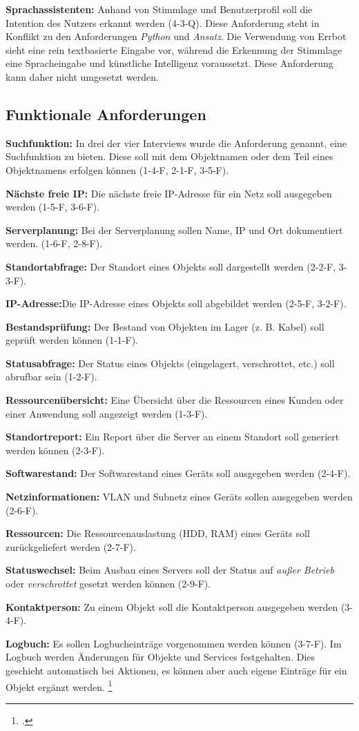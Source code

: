 \textbf{Sprachassistenten:} Anhand von Stimmlage und Benutzerprofil soll die Intention des Nutzers erkannt werden (4-3-Q). Diese Anforderung steht in Konflikt zu den Anforderungen \textit{Python} und \textit{Ansatz}. Die Verwendung von Errbot sieht eine rein textbasierte Eingabe vor, während die Erkennung der Stimmlage eine Spracheingabe und künstliche Intelligenz voraussetzt. Diese Anforderung kann daher nicht umgesetzt werden.


\subsection{Funktionale Anforderungen}
\textbf{Suchfunktion: } In drei der vier Interviews wurde die Anforderung genannt, eine Suchfunktion zu bieten. Diese soll mit dem Objektnamen oder dem Teil eines Objektnamens erfolgen können (1-4-F, 2-1-F, 3-5-F).

\textbf{Nächste freie IP: } Die nächste freie IP-Adresse für ein Netz soll ausgegeben werden (1-5-F, 3-6-F). 

\textbf{Serverplanung: } Bei der Serverplanung sollen Name, IP und Ort dokumentiert werden. (1-6-F, 2-8-F).

\textbf{Standortabfrage: } Der Standort eines Objekts soll dargestellt werden (2-2-F, 3-3-F).

\textbf{IP-Adresse:}Die IP-Adresse eines Objekts soll abgebildet werden (2-5-F, 3-2-F).

\textbf{Bestandsprüfung:} Der Bestand von Objekten im Lager (z. B. Kabel) soll geprüft werden können (1-1-F).

\textbf{Statusabfrage: }Der Status eines Objekts (eingelagert, verschrottet, etc.) soll abrufbar sein (1-2-F).

\textbf{Ressourcenübersicht:} Eine Übersicht über die Ressourcen eines Kunden oder einer Anwendung soll angezeigt werden (1-3-F).

\textbf{Standortreport:} Ein Report über die Server an einem Standort soll generiert werden können (2-3-F).

\textbf{Softwarestand:} Der Softwarestand eines Geräts soll ausgegeben werden (2-4-F).

\textbf{Netzinformationen:} VLAN und Subnetz eines Geräts sollen ausgegeben werden (2-6-F).

\textbf{Ressourcen: } Die Ressourcenauslastung (HDD, RAM) eines Geräts soll zurückgeliefert werden (2-7-F).

\textbf{Statuswechsel:} Beim Ausbau eines Servers soll der Status auf \textit{außer Betrieb} oder \textit{verschrottet} gesetzt werden können (2-9-F).

\textbf{Kontaktperson:} Zu einem Objekt soll die Kontaktperson ausgegeben werden (3-4-F).

\textbf{Logbuch:} Es sollen Logbucheinträge vorgenommen werden können (3-7-F). Im Logbuch werden Änderungen für Objekte und Services festgehalten. Dies geschieht automatisch bei Aktionen, es können aber auch eigene Einträge für ein Objekt ergänzt werden.
\footcite[Vgl.][o. \pno]{idoit_2019_logbuch}


